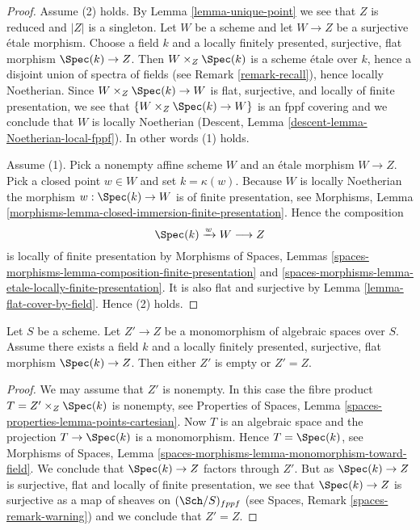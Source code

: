 \begin{proof}
Assume (2) holds. By
Lemma \ref{lemma-unique-point}
we see that $Z$ is reduced and $|Z|$ is a singleton.
Let $W$ be a scheme and let $W \to Z$ be a surjective \'etale
morphism. Choose a field $k$ and a locally finitely presented, surjective,
flat morphism $\Spec(k) \to Z$.
Then $W \times_Z \Spec(k)$ is a scheme
\'etale over $k$, hence a disjoint union of spectra of fields
(see Remark \ref{remark-recall}),
hence locally Noetherian. Since $W \times_Z \Spec(k) \to W$
is flat, surjective, and locally of finite presentation, we see
that $\{W \times_Z \Spec(k) \to W\}$ is an fppf covering
and we conclude that $W$ is locally Noetherian
(Descent, Lemma
\ref{descent-lemma-Noetherian-local-fppf}).
In other words (1) holds.

\medskip\noindent
Assume (1). Pick a nonempty affine scheme $W$ and an \'etale morphism
$W \to Z$. Pick a closed point $w \in W$ and set
$k = \kappa(w)$. Because $W$ is locally Noetherian the morphism
$w : \Spec(k) \to W$ is of finite presentation, see
Morphisms, Lemma \ref{morphisms-lemma-closed-immersion-finite-presentation}.
Hence the composition
$$
\Spec(k) \xrightarrow{w} W \longrightarrow Z
$$
is locally of finite presentation by
Morphisms of Spaces, Lemmas
\ref{spaces-morphisms-lemma-composition-finite-presentation} and
\ref{spaces-morphisms-lemma-etale-locally-finite-presentation}.
It is also flat and surjective by
Lemma \ref{lemma-flat-cover-by-field}.
Hence (2) holds.
\end{proof}

\begin{lemma}
\label{lemma-monomorphism-into-point}
Let $S$ be a scheme.
Let $Z' \to Z$ be a monomorphism of algebraic spaces over $S$.
Assume there exists a field $k$ and a locally finitely presented, surjective,
flat morphism $\Spec(k) \to Z$. Then either $Z'$
is empty or $Z' = Z$.
\end{lemma}

\begin{proof}
We may assume that $Z'$ is nonempty. In this case the
fibre product $T = Z' \times_Z \Spec(k)$
is nonempty, see
Properties of Spaces, Lemma \ref{spaces-properties-lemma-points-cartesian}.
Now $T$ is an algebraic space and the projection $T \to \Spec(k)$
is a monomorphism. Hence $T = \Spec(k)$, see
Morphisms of Spaces, Lemma
\ref{spaces-morphisms-lemma-monomorphism-toward-field}.
We conclude that $\Spec(k) \to Z$ factors through $Z'$.
But as $\Spec(k) \to Z$ is surjective, flat and locally of finite
presentation, we see that $\Spec(k) \to Z$ is surjective as a
map of sheaves on $(\Sch/S)_{fppf}$ (see
Spaces, Remark \ref{spaces-remark-warning})
and we conclude that $Z' = Z$.
\end{proof}

